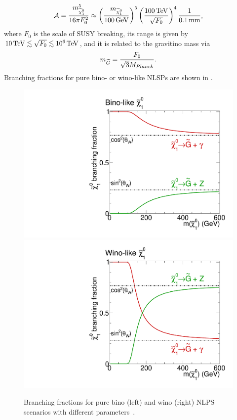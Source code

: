 \begin{equation}
 \mathcal{A} = \frac{m_{\widetilde{\chi}^{0}_{1}}^5}{16\pi F_{0}^{2}}\approx\left(\frac{m_{\widetilde{\chi}^{0}_{1}}}{100\,\text{Ge\hspace{-.08em}V}}\right)^5\left(\frac{100\,\text{Te\hspace{-.08em}V}}{\sqrt{F_0}}\right)^4 \frac{1}{0.1\,\text{mm}},
\end{equation}
where $F_0$ is the scale of SUSY breaking, its range is given by $10\,\text{Te\hspace{-.08em}V}\lesssim\sqrt{F_0}\lesssim10^6\,\text{Te\hspace{-.08em}V}$, and it is related to the gravitino mass via
\begin{equation}
 m_{\widetilde{G}}=\frac{F_0}{\sqrt{3}M_{Planck}}.
\end{equation}
Branching fractions for pure bino- or wino-like NLSPs are shown in .
\begin{figure}[htb]
 \centering
 \includegraphics[width=\pairwidth]{figures/signal/binoBranching}
 \includegraphics[width=\pairwidth]{figures/signal/winoBranching}%
 \caption{Branching fractions for pure bino (left) and wino (right) NLPS scenarios with different parameters~\cite{Kiesel}.}
 \label{fig:BRNLSP}
\end{figure}
